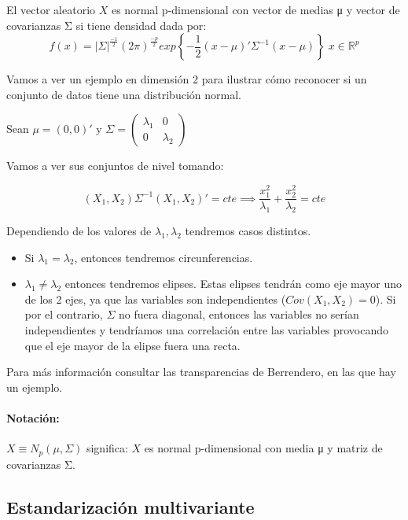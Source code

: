 \begin{defn}El vector aleatorio $X$ es normal p-dimensional  con vector de medias μ y vector de covarianzas Σ si tiene densidad dada por:
\[
f(x) = |Σ|^\frac{-1}{2}(2π)^{\frac{-p}{2}}exp\left\{ -\frac{1}{2}(x-μ)'Σ^{-1}(x-μ) \right\}\; x∈ℝ^p
\]

\begin{example}
Vamos a ver un ejemplo en dimensión 2 para ilustrar cómo reconocer si un conjunto de datos tiene una distribución normal.

Sean $μ = (0,0)'$ y $Σ = \begin{pmatrix} λ_1 & 0 \\ 0 & λ_2 \end{pmatrix}$

Vamos a ver sus conjuntos de nivel tomando:

\[(X_1,X_2) Σ^{-1} (X_1,X_2)' = cte \implies \frac{x_1^2}{λ_1} + \frac{x_2^2}{λ_2} = cte\]


Dependiendo de los valores de $λ_1,λ_2$ tendremos casos distintos.

\begin{itemize}
	\item Si $λ_1 = λ_2$, entonces tendremos circunferencias.
	\item $λ_1 ≠ λ_2$ entonces tendremos elipses.
	\subitem
	Estas elipses tendrán como eje mayor uno de los 2 ejes, ya que las variables son independientes ($Cov(X_1,X_2) = 0$).
	\subitem Si por el contrario, $Σ$ no fuera diagonal, entonces las variables no serían independientes y tendríamos una correlación entre las variables provocando que el eje mayor de la elipse fuera una recta.
\end{itemize}


Para más información consultar las transparencias de Berrendero, en las que hay un ejemplo.


\end{example}


\paragraph{Notación:} $X \equiv N_p(μ,Σ)$ significa: $X$ es normal p-dimensional con media μ y matriz de covarianzas Σ.
\end{defn}

\subsection{Estandarización multivariante}


